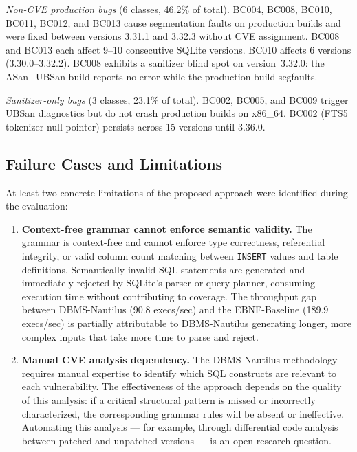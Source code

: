 \emph{Non-CVE production bugs} (6 classes, 46.2\% of total). BC004, BC008, BC010, BC011, BC012, and BC013 cause segmentation faults on production builds and were fixed between versions 3.31.1 and 3.32.3 without CVE assignment. BC008 and BC013 each affect 9--10 consecutive SQLite versions. BC010 affects 6 versions (3.30.0--3.32.2). BC008 exhibits a sanitizer blind spot on version~3.32.0: the ASan+UBSan build reports no error while the production build segfaults.

\emph{Sanitizer-only bugs} (3 classes, 23.1\% of total). BC002, BC005, and BC009 trigger UBSan diagnostics but do not crash production builds on x86\_64. BC002 (FTS5 tokenizer null pointer) persists across 15 versions until 3.36.0.

\subsection{Failure Cases and Limitations}
\label{sec:limitations}

At least two concrete limitations of the proposed approach were identified during the evaluation:

\begin{enumerate}
  \item \textbf{Context-free grammar cannot enforce semantic validity.} The grammar is context-free and cannot enforce type correctness, referential integrity, or valid column count matching between \texttt{INSERT} values and table definitions. Semantically invalid SQL statements are generated and immediately rejected by SQLite's parser or query planner, consuming execution time without contributing to coverage. The throughput gap between DBMS-Nautilus (90.8 execs/sec) and the EBNF-Baseline (189.9 execs/sec) is partially attributable to DBMS-Nautilus generating longer, more complex inputs that take more time to parse and reject.

  \item \textbf{Manual CVE analysis dependency.} The DBMS-Nautilus methodology requires manual expertise to identify which SQL constructs are relevant to each vulnerability. The effectiveness of the approach depends on the quality of this analysis: if a critical structural pattern is missed or incorrectly characterized, the corresponding grammar rules will be absent or ineffective. Automating this analysis --- for example, through differential code analysis between patched and unpatched versions --- is an open research question.
\end{enumerate}

